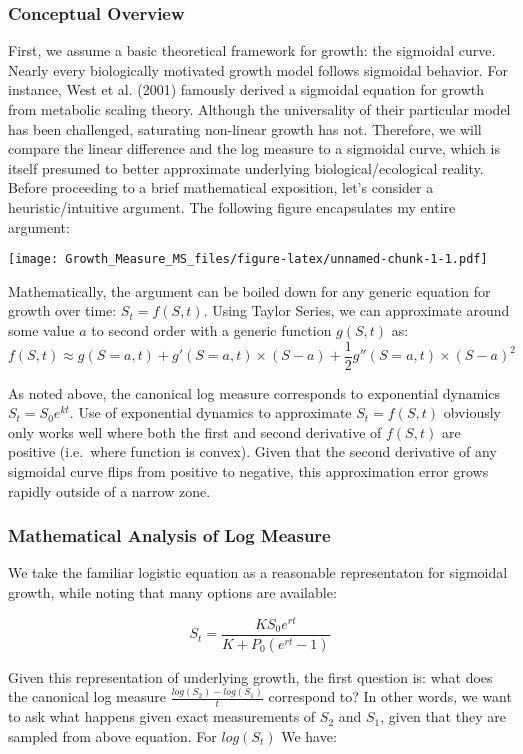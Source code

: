 \documentclass[]{article}
\begin{document}
\subsubsection{Conceptual Overview}\label{conceptual-overview}

First, we assume a basic theoretical framework for growth: the sigmoidal
curve. Nearly every biologically motivated growth model follows
sigmoidal behavior. For instance, West et al. (2001) famously derived a
sigmoidal equation for growth from metabolic scaling theory. Although
the universality of their particular model has been challenged,
saturating non-linear growth has not. Therefore, we will compare the
linear difference and the log measure to a sigmoidal curve, which is
itself presumed to better approximate underlying biological/ecological
reality. Before proceeding to a brief mathematical exposition, let's
consider a heuristic/intuitive argument. The following figure
encapsulates my entire argument:

\texttt{[image: Growth\_Measure\_MS\_files/figure-latex/unnamed-chunk-1-1.pdf]}

Mathematically, the argument can be boiled down for any generic equation
for growth over time: \(S_t = f(S,t)\). Using Taylor Series, we can
approximate around some value \(a\) to second order with a generic
function \(g(S,t)\) as:
\[f(S,t) \approx g(S=a,t) + g'(S=a,t) \times (S-a) + \frac{1}{2}g''(S=a,t)\times(S-a)^2\]

As noted above, the canonical log measure corresponds to exponential
dynamics \(S_t = S_0e^{kt}\). Use of exponential dynamics to approximate
\(S_t = f(S,t)\) obviously only works well where both the first and
second derivative of \(f(S,t)\) are positive (i.e.~where function is
convex). Given that the second derivative of any sigmoidal curve flips
from positive to negative, this approximation error grows rapidly
outside of a narrow zone.

\subsubsection{Mathematical Analysis of Log
Measure}\label{mathematical-analysis-of-log-measure}

We take the familiar logistic equation as a reasonable representaton for
sigmoidal growth, while noting that many options are available:

\[S_t = \frac{KS_0e^{rt}}{K+P_0(e^{rt}-1)}\]

Given this representation of underlying growth, the first question is:
what does the canonical log measure \(\frac{log(S_2) - log(S_1)}{t}\)
correspond to? In other words, we want to ask what happens given exact
measurements of \(S_2\) and \(S_1\), given that they are sampled from
above equation. For \(log(S_t)\) We have:
\end{document}
